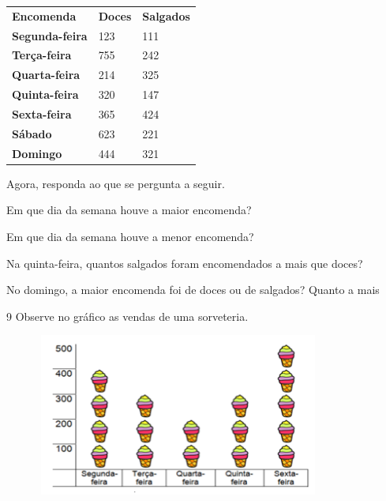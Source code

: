 \begin{table}[H]\centering
\begin{tabular}{lll}
\textbf{Encomenda}     & \textbf{Doces} & \textbf{Salgados} \\
\textbf{Segunda-feira} & 123            & 111               \\
\textbf{Terça-feira}   & 755            & 242               \\
\textbf{Quarta-feira}  & 214            & 325               \\
\textbf{Quinta-feira}  & 320            & 147               \\
\textbf{Sexta-feira}   & 365            & 424               \\
\textbf{Sábado}        & 623            & 221               \\
\textbf{Domingo}       & 444            & 321              
\end{tabular}
\end{table}

Agora, responda ao que se pergunta a seguir.

\begin{escolha}
\item Em que dia da semana houve a maior encomenda?\\

\item Em que dia da semana houve a menor encomenda?\\

\item Na quinta-feira, quantos salgados foram encomendados a mais que doces?\\

\item No domingo, a maior encomenda foi de doces ou de salgados? Quanto a mais\\
\end{escolha}

\num{9}  Observe no gráfico as vendas de uma sorveteria.

\begin{figure}[H]
\centering\includegraphics[width=3.7in,height=2.1in]{./imgSAEB_6_MAT/media/image87.png}
\end{figure}

